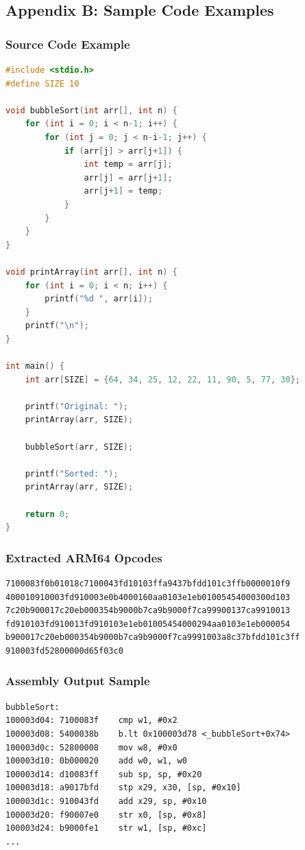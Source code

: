 \documentclass[11pt,a4paper]{article}
\begin{document}
\subsection{Appendix B: Sample Code Examples}

\subsubsection{Source Code Example}
\begin{lstlisting}[language=C, caption=Array sorting program (80 lines) - achieved 88.3\% efficiency]
#include <stdio.h>
#define SIZE 10

void bubbleSort(int arr[], int n) {
    for (int i = 0; i < n-1; i++) {
        for (int j = 0; j < n-i-1; j++) {
            if (arr[j] > arr[j+1]) {
                int temp = arr[j];
                arr[j] = arr[j+1];
                arr[j+1] = temp;
            }
        }
    }
}

void printArray(int arr[], int n) {
    for (int i = 0; i < n; i++) {
        printf("%d ", arr[i]);
    }
    printf("\n");
}

int main() {
    int arr[SIZE] = {64, 34, 25, 12, 22, 11, 90, 5, 77, 30};
    
    printf("Original: ");
    printArray(arr, SIZE);
    
    bubbleSort(arr, SIZE);
    
    printf("Sorted: ");
    printArray(arr, SIZE);
    
    return 0;
}
\end{lstlisting}

\subsubsection{Extracted ARM64 Opcodes}
\begin{lstlisting}[caption=Corresponding pure ARM64 opcodes (27 tokens vs 230 source tokens)]
7100083f0b01018c7100043fd10103ffa9437bfdd101c3ffb0000010f9
400010910003fd910003e0b4000160aa0103e1eb01005454000300d103
7c20b900017c20eb000354b9000b7ca9b9000f7ca99900137ca9910013
fd910103fd910013fd910103e1eb01005454000294aa0103e1eb000054
b900017c20eb000354b9000b7ca9b9000f7ca9991003a8c37bfdd101c3ff
910003fd52800000d65f03c0
\end{lstlisting}

\subsubsection{Assembly Output Sample}
\begin{lstlisting}[caption=objdump assembly output (3671 tokens - highly inefficient)]
bubbleSort:
100003d04: 7100083f    cmp w1, #0x2
100003d08: 5400038b    b.lt 0x100003d78 <_bubbleSort+0x74>
100003d0c: 52800008    mov w8, #0x0
100003d10: 0b000020    add w0, w1, w0
100003d14: d10083ff    sub sp, sp, #0x20
100003d18: a9017bfd    stp x29, x30, [sp, #0x10]
100003d1c: 910043fd    add x29, sp, #0x10
100003d20: f90007e0    str x0, [sp, #0x8]
100003d24: b9000fe1    str w1, [sp, #0xc]
...
\end{lstlisting}
\end{document}
